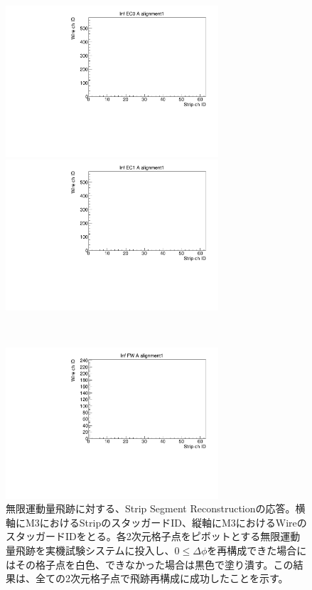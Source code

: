 \begin{figure}
    \begin{minipage}[b]{.5\linewidth}
        \centering
        \includegraphics[height=5.6cm]{fig/Test/A_InfEC0_strip.pdf}
    \end{minipage}
    \begin{minipage}[b]{.5\linewidth}
        \centering
        \includegraphics[height=5.6cm]{fig/Test/A_InfEC1_strip.pdf}
    \end{minipage}\\
    \begin{minipage}[b]{\linewidth}
        \centering
        \includegraphics[height=5.6cm]{fig/Test/A_InfFW_strip.pdf}
    \end{minipage}
    \caption[無限運動量飛跡に対する、Strip Segment Reconstructionの応答]{無限運動量飛跡に対する、Strip Segment Reconstructionの応答。横軸にM3におけるStripのスタッガードID、縦軸にM3におけるWireのスタッガードIDをとる。各2次元格子点をピボットとする無限運動量飛跡を実機試験システムに投入し、$0 \leq \Delta\phi$を再構成できた場合にはその格子点を白色、できなかった場合は黒色で塗り潰す。この結果は、全ての2次元格子点で飛跡再構成に成功したことを示す。}
    \label{Inf_A_Strip}
\end{figure}


